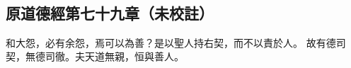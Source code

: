 ﻿%
%

\chapter{~}

\section{原道德經第七十九章（未校註）}

\begin{withgezhu}

\zhsong


和大怨，必有余怨，焉可以為善？\textcolor{tongjia-color}{是以聖人持右契}，而不以責於人。
故有德司契，無德司徹。夫天道無親，恒與善人。

\end{withgezhu}
